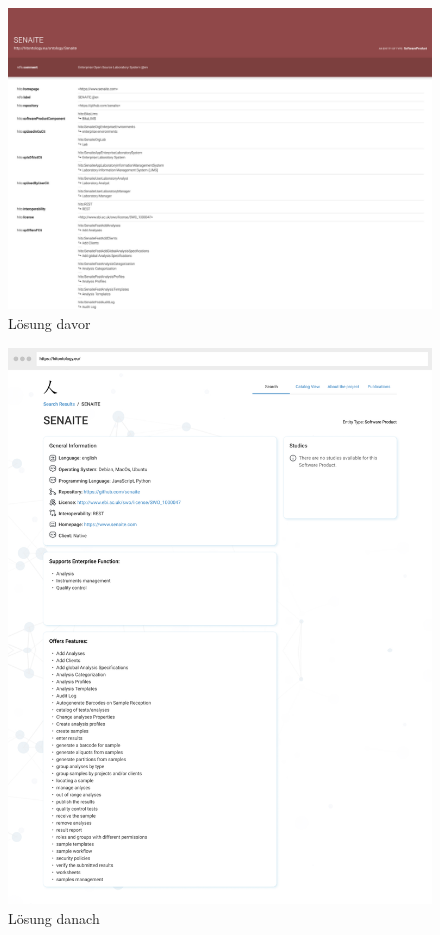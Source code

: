 \begin{enumerate}
\begin{figure}[H]
	\centering
    	\includegraphics[width=\textwidth]{Images/Punkt_2_davor}
   	\caption{Lösung davor}
   	\label{fig:point2_before}
\end{figure}

\clearpage

\begin{figure}[H]
	\centering
    	\includegraphics[width=\textwidth]{Images/SP_Detailseite}
   	\caption{Lösung danach}
   	\label{fig:point2_after}
\end{figure}


\end{enumerate}
